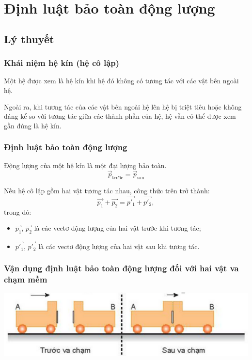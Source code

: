 \let\lesson\undefined
\newcommand{\lesson}{\phantomlesson{Bài 20: Định luật bảo toàn động lượng.}}
\chapter[Định luật bảo toàn động lượng]{Định luật bảo toàn động lượng}
\setcounter{section}{0}
\section{Lý thuyết}
\subsection{Khái niệm hệ kín (hệ cô lập)}
Một hệ được xem là hệ kín khi hệ đó không có tương tác với các vật bên ngoài hệ.

Ngoài ra, khi tương tác của các vật bên ngoài hệ lên hệ bị triệt tiêu hoặc không đáng kể so với tương tác giữa các thành phần của hệ, hệ vẫn có thể được xem gần đúng là hệ kín.


\subsection{Định luật bảo toàn động lượng}
Động lượng của một hệ kín là một đại lượng bảo toàn.
\begin{equation*}
	\vec{p}_{\text{trước}}=\vec{p}_{\text{sau}}
\end{equation*}

Nếu hệ cô lập gồm hai vật tương tác nhau, công thức trên trở thành:
\begin{equation*}
	\vec{p_1}+\vec{p_2} = \vec{p'_1}+\vec{p'_2},
\end{equation*}
trong đó: 
\begin{itemize}
	\item $	\vec{p_1}$, $\vec{p_2}$ là các vectơ động lượng của hai vật trước khi tương tác;
	\item $	\vec{p'_1}$, $\vec{p'_2}$ là các vectơ động lượng của hai vật sau khi tương tác.
\end{itemize}
\subsection{Vận dụng định luật bảo toàn động lượng đối với hai vật va chạm mềm}
\begin{center}
	\includegraphics[scale=0.8]{../figs/G10-024-1}
\end{center}

